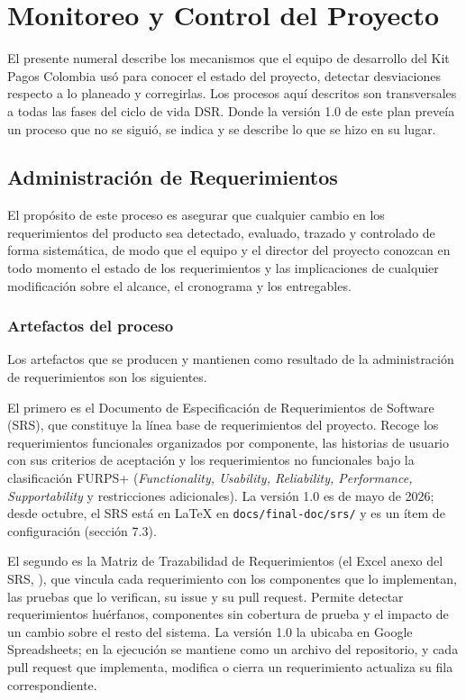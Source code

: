 \section{Monitoreo y Control del Proyecto}

El presente numeral describe los mecanismos que el equipo de desarrollo del Kit Pagos Colombia usó para conocer el estado del proyecto, detectar desviaciones respecto a lo planeado y corregirlas. Los procesos aquí descritos son transversales a todas las fases del ciclo de vida DSR. Donde la versión 1.0 de este plan preveía un proceso que no se siguió, se indica y se describe lo que se hizo en su lugar.

\subsection{Administración de Requerimientos}

El propósito de este proceso es asegurar que cualquier cambio en los requerimientos del producto sea detectado, evaluado, trazado y controlado de forma sistemática, de modo que el equipo y el director del proyecto conozcan en todo momento el estado de los requerimientos y las implicaciones de cualquier modificación sobre el alcance, el cronograma y los entregables.

\subsubsection{Artefactos del proceso}

Los artefactos que se producen y mantienen como resultado de la administración de requerimientos son los siguientes.

El primero es el Documento de Especificación de Requerimientos de Software (SRS), que constituye la línea base de requerimientos del proyecto. Recoge los requerimientos funcionales organizados por componente, las historias de usuario con sus criterios de aceptación y los requerimientos no funcionales bajo la clasificación FURPS+ (\textit{Functionality, Usability, Reliability, Performance, Supportability} y restricciones adicionales). La versión 1.0 es de mayo de 2026; desde octubre, el SRS está en LaTeX en \texttt{docs/final-doc/srs/} y es un ítem de configuración (sección 7.3).

El segundo es la Matriz de Trazabilidad de Requerimientos (el Excel anexo del SRS, ), que vincula cada requerimiento con los componentes que lo implementan, las pruebas que lo verifican, su issue y su pull request. Permite detectar requerimientos huérfanos, componentes sin cobertura de prueba y el impacto de un cambio sobre el resto del sistema. La versión 1.0 la ubicaba en Google Spreadsheets; en la ejecución se mantiene como un archivo del repositorio, y cada pull request que implementa, modifica o cierra un requerimiento actualiza su fila correspondiente.

